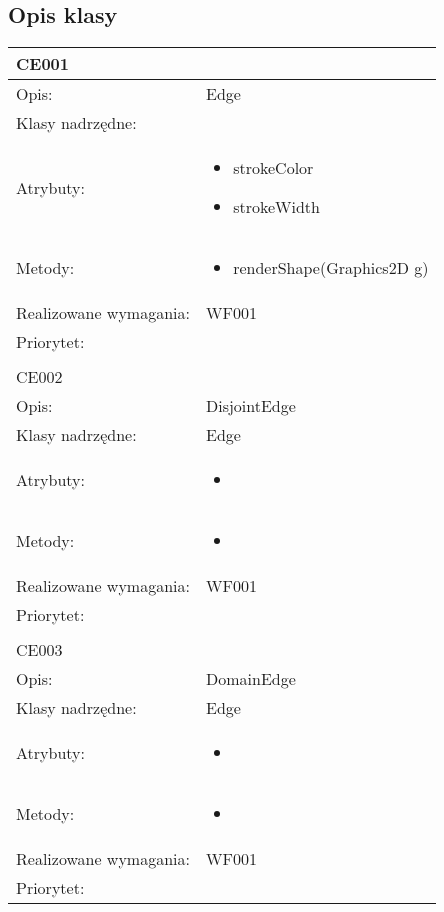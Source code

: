 \documentclass[a4paper,10pt]{article}
\begin{document}
\subsection{Opis klasy}

\begin{center}

\begin{longtable}{|m{3cm}|m{9cm}|} \hline

CE001 &  \\ \hline
Opis: & Edge    \\ \hline
Klasy nadrzędne: &     \\ \hline
Atrybuty: & \begin{itemize}
 \item strokeColor
 \item strokeWidth 
\end{itemize}
 \\ \hline
Metody: & \begin{itemize}
 \item renderShape(Graphics2D g)
\end{itemize}
  \\ \hline
Realizowane wymagania: & WF001 \\ \hline
Priorytet: &  \\ \hline

\multicolumn{2}{c}{} \\
 \hline

CE002 &  \\ \hline
Opis: & DisjointEdge    \\ \hline
Klasy nadrzędne: & Edge    \\ \hline
Atrybuty: & \begin{itemize}
 \item 
\end{itemize}
 \\ \hline
Metody: & \begin{itemize}
 \item 
\end{itemize}
  \\ \hline
Realizowane wymagania: & WF001 \\ \hline
Priorytet: &  \\ \hline

\multicolumn{2}{c}{} \\
 \hline

CE003 &  \\ \hline
Opis: & DomainEdge    \\ \hline
Klasy nadrzędne: & Edge    \\ \hline
Atrybuty: & \begin{itemize}
 \item 
\end{itemize}
 \\ \hline
Metody: & \begin{itemize}
 \item 
\end{itemize}
  \\ \hline
Realizowane wymagania: & WF001 \\ \hline
Priorytet: &  \\ \hline


\end{longtable}
\end{center}
\end{document}
